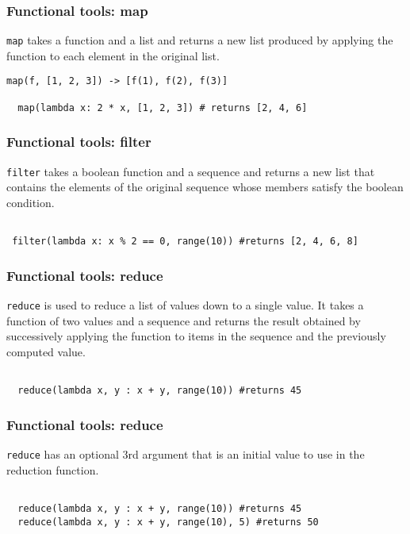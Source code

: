 \documentclass[10pt]{beamer}
\begin{document}
\begin{frame}[fragile]
  \frametitle{Functional tools: map}

  \texttt{map} takes a function and a list and returns a new list
  produced by applying the function to each element in the original
  list.  
\begin{Verbatim}[commandchars=\\\%\%]
  map(f, [1, 2, 3]) -> [f(1), f(2), f(3)]

  map(lambda x: 2 * x, [1, 2, 3]) # returns [2, 4, 6]
  \end{Verbatim}
\end{frame}
\begin{frame}[fragile]
  \frametitle{Functional tools: filter}

  \texttt{filter} takes a boolean function and a sequence and returns a new list
  that contains the elements of the original sequence whose members satisfy the 
  boolean condition.
  \begin{Verbatim}[commandchars=\\\!\!]

 filter(lambda x: x % 2 == 0, range(10)) #returns [2, 4, 6, 8]
  \end{Verbatim}
\end{frame}
\begin{frame}[fragile]
  \frametitle{Functional tools: reduce}

  \texttt{reduce} is used to reduce a list of values down to a single value. It
  takes a function of two values and a sequence and returns the result obtained by successively
  applying the function to items in the sequence and the previously computed value.
  \begin{Verbatim}[commandchars=\\\!\!]

  reduce(lambda x, y : x + y, range(10)) #returns 45
  \end{Verbatim}
\end{frame}
\begin{frame}[fragile]
  \frametitle{Functional tools: reduce}

  \texttt{reduce} has an optional 3rd argument that is an initial value to
  use in the reduction function.
  \begin{Verbatim}[commandchars=\\\!\!]

  reduce(lambda x, y : x + y, range(10)) #returns 45
  reduce(lambda x, y : x + y, range(10), 5) #returns 50
  \end{Verbatim}
\end{frame}
\end{document}

